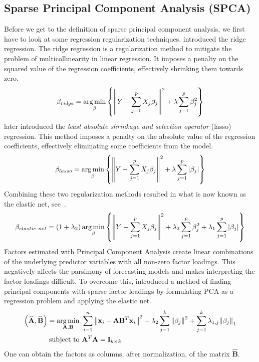 \subsection{Sparse Principal Component Analysis (SPCA)}
\label{sec:spca}
Before we get to the definition of sparse principal component analysis, we first have to look at some regression regularization techniques. 
\textcite{bell_solutions_1978} introduced the ridge regression.
The ridge regression is a regularization method to mitigate the problem of multicollinearity in linear regression.
It imposes a penalty on the squared value of the regression coefficients, effectively shrinking them towards zero.
\begin{equation}
	\beta_{ridge} = \operatorname*{\arg\min}_{\beta} \left\{ { \left\lVert Y - \sum_{j=1}^p X_j \beta_j \right\rVert }^2 + \lambda \sum_{j=1}^p \beta_j^2 \right\} 
\end{equation}
\textcite{tibshirani_regression_1996} later introduced the \textit{least absolute shrinkage and selection operator} (lasso) regression. 
This method imposes a penalty on the absolute value of the regression coefficients, effectively eliminating some coefficients from the model.
\begin{equation}
	\beta_{lasso} = \operatorname*{\arg\min}_{\beta} \left\{ { \left\lVert Y - \sum_{j=1}^p X_j \beta_j \right\rVert }^2 + \lambda \sum_{j=1}^p |\beta_j| \right\} 
\end{equation}
Combining these two regularization methods resulted in what is now known as the elastic net, see~\textcite{zou_regularization_2005}.
\begin{equation}
	\beta_{elastic\ net} = (1 + \lambda_2) \operatorname*{\arg\min}_{\beta} \left\{ { \left\lVert Y - \sum_{j=1}^p X_j \beta_j \right\rVert }^2 + \lambda_2 \sum_{j=1}^p \beta_j^2 + \lambda_1 \sum_{j=1}^p |\beta_j|  \right\} 
\end{equation}
Factors estimated with Principal Component Analysis create linear combinations of the underlying predictor variables with all non-zero factor loadings. 
This negatively affects the parsimony of forecasting models and makes interpreting the factor loadings difficult. 
To overcome this, \textcite{zou_sparse_2006} introduced a method of finding principal components with sparse factor loadings by formulating PCA as a regression problem and applying the elastic net. 
\begin{equation}
\begin{aligned}
	\left(\mathbf{\widehat{A}},\mathbf{\widehat{B}}\right) = \operatorname*{\arg\min}_{\mathbf{A},\mathbf{B}}\ &\sum_{i=1}^n { \left\lVert \mathbf{x}_i - \mathbf{A}\mathbf{B}^T\mathbf{x}_i \right\rVert }^2 + \lambda_2 \sum_{j=1}^k {\lVert \beta_j \rVert}^2 + \sum_{j=1}^k \lambda_{1,j} {\lVert \beta_j \rVert}_1 \\
	\text{subject to}\ &\mathbf{A}^T\mathbf{A} = \mathbf{I}_{k \times k}
\end{aligned}
\end{equation}
One can obtain the factors as columns, after normalization, of the matrix $\mathbf{\widehat{B}}$.

